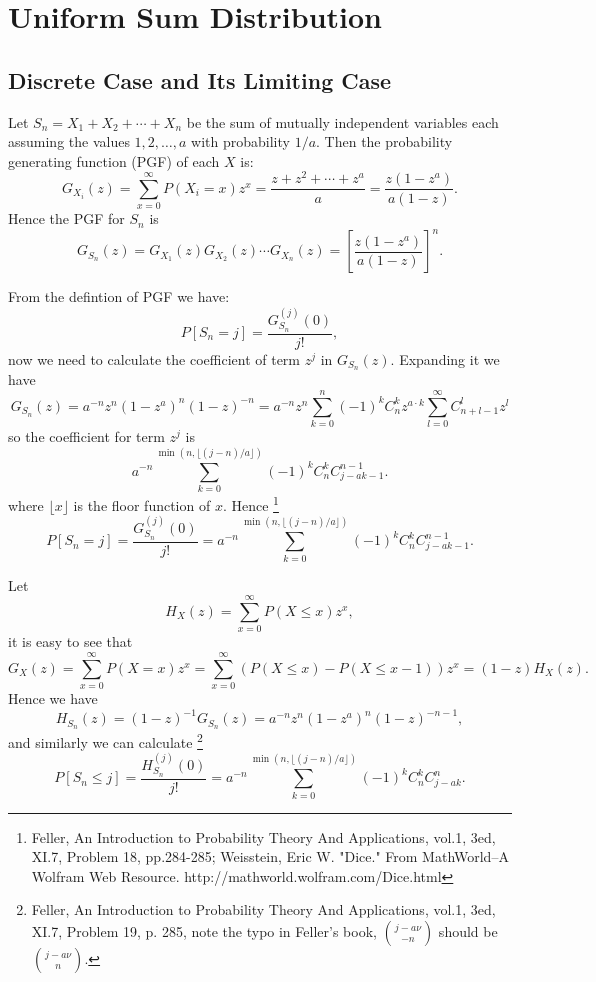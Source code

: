 \chapter{Uniform Sum Distribution}

\section{Discrete Case and Its Limiting Case}
Let $S_n=X_1+X_2+\cdots + X_n$ be the sum of mutually independent variables each
assuming the values $1,2,\dots, a$ with probability $1/a$. Then the probability
generating function (PGF) of each $X$ is:
\[
  G_{X_i}(z)=\sum_{x=0}^{\infty} P(X_i=x) z^x = \frac{z+z^2+\cdots +z^a}{a} 
    =\frac{z(1-z^a)}{a(1-z)}.
\]
Hence the PGF for $S_n$ is
\begin{equation}
  G_{S_n}(z)=G_{X_1}(z) G_{X_2}(z) \cdots G_{X_n}(z) 
   = \left[ \frac{z(1-z^a)}{a(1-z)} \right]^n.
\end{equation}

From the defintion of PGF we have:
\begin{equation}
  P[S_n=j] = \frac{G_{S_n}^{(j)}(0)}{j!},
\end{equation}
now we need to calculate the coefficient of term $z^j$ in $G_{S_n}(z)$.
Expanding it we have
\[
	G_{S_n}(z) = a^{-n} z^n (1-z^a)^n (1-z)^{-n} 
          	 = a^{-n} z^n \sum_{k=0}^n (-1)^k C_n^k z^{a\cdot k} 
                          \sum_{l=0}^{\infty} C_{n+l-1}^l z^l
\]
so the coefficient for term $z^j$ is
\[
	a^{-n} \sum_{k=0}^{\min(n,\lfloor (j-n)/a\rfloor)} (-1)^k C_n^k C_{j-ak-1}^{n-1}.
\]
where $\lfloor x\rfloor$ is the floor function of $x$.
Hence
\footnote{Feller, An Introduction to Probability Theory And Applications, 
  vol.1, 3ed, XI.7, Problem 18, pp.284-285; 
  Weisstein, Eric W. "Dice." From MathWorld--A Wolfram Web Resource. 
  http://mathworld.wolfram.com/Dice.html }
\begin{equation}
  P[S_n=j] = \frac{G_{S_n}^{(j)}(0)}{j!}
	= a^{-n} \sum_{k=0}^{\min(n,\lfloor (j-n)/a\rfloor)} (-1)^k C_n^k C_{j-ak-1}^{n-1}.
\end{equation}

Let
\[
	H_X(z) = \sum_{x=0}^{\infty} P(X\le x) z^x,
\]
it is easy to see that
\[
	G_X(z) = \sum_{x=0}^{\infty} P(X=x) z^x
   	= \sum_{x=0}^{\infty} (P(X\le x) - P(X\le x-1)) z^x
	  = (1-z) H_X(z).
\]
Hence we have 
\[
  H_{S_n}(z) = (1-z)^{-1} G_{S_n}(z) = a^{-n} z^n (1-z^a)^n (1-z)^{-n-1}, 
\]
and similarly we can calculate
\footnote{Feller, An Introduction to Probability Theory And Applications, 
  vol.1, 3ed, XI.7, Problem 19, p. 285, note the typo in Feller's book, 
  $\binom{j-a\nu}{-n}$ should be $\binom{j-a\nu}{n}$.}
\begin{equation}
  P[S_n\le j] = \frac{H_{S_n}^{(j)}(0)}{j!}
	= a^{-n} \sum_{k=0}^{\min(n,\lfloor (j-n)/a\rfloor)} (-1)^k C_n^k C_{j-ak}^{n}.
\end{equation}

